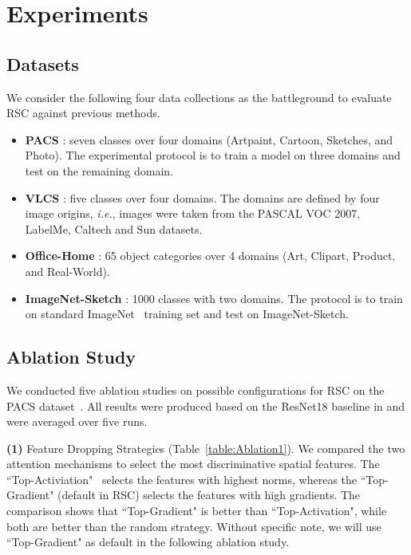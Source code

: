 \documentclass[runningheads]{llncs}
\newcommand{\method}{RSC}
\begin{document}
 
\section{Experiments}
\label{sec:exp}
\subsection{Datasets}

We consider the following four data collections as the battleground to evaluate \method{} against previous methods. 









\begin{itemize}
    \item \textbf{PACS} \cite{li2017deeper}: seven classes over four domains (Artpaint, Cartoon, Sketches, and Photo). The experimental protocol is to train a model on three domains and test on the remaining domain. 
    \item \textbf{VLCS} \cite{torralba2011unbiased}: five classes over four domains. The domains are defined by four image origins, \textit{i.e.}, images were taken from the PASCAL VOC 2007, LabelMe, Caltech and Sun datasets.
    \item \textbf{Office-Home} \cite{venkateswara2017deep}: 65 object categories over 4 domains (Art, Clipart, Product, and Real-World). 
    \item \textbf{ImageNet-Sketch} \cite{wang2019learning}: 1000 classes with two domains. The protocol is to train on standard ImageNet~\cite{ILSVRC15} training set and test on ImageNet-Sketch. 
\end{itemize}












\subsection{Ablation Study}




We conducted five ablation studies on possible configurations for RSC on the PACS dataset~\cite{li2017deeper}. All results were produced based on the ResNet18 baseline in \cite{carlucci2019domain} and were averaged over five runs. 


\textbf{(1)} Feature Dropping Strategies (Table~\ref{table:Ablation1}). We compared the two attention mechanisms to select the most discriminative spatial features. The ``Top-Activiation"~\cite{park2016analysis} selects the features with highest norms, whereas the ``Top-Gradient" (default in RSC) selects the features with high gradients. The comparison shows that ``Top-Gradient" is better than ``Top-Activation", 
while both are better than the random strategy.  Without specific note, we will use ``Top-Gradient" as default in the following ablation study.
\end{document}
